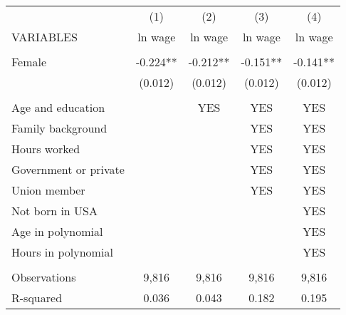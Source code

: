 \begin{tabular}{lcccc} 
\toprule
 & (1) & (2) & (3) & (4) \\
VARIABLES & ln wage & ln wage & ln wage & ln wage \\ \midrule
 &  &  &  &  \\
Female & -0.224** & -0.212** & -0.151** & -0.141** \\
 & (0.012) & (0.012) & (0.012) & (0.012) \\
 &  &  &  &  \\
Age and education &  & YES & YES & YES \\
Family background &  &  & YES & YES \\
Hours worked &  &  & YES & YES \\
Government or private &  &  & YES & YES \\
Union member &  &  & YES & YES \\
Not born in USA &  &  &  & YES \\
Age in polynomial &  &  &  & YES \\
Hours in polynomial &  &  &  & YES \\
 &  &  &  &  \\
 \midrule
Observations & 9,816 & 9,816 & 9,816 & 9,816 \\
 R-squared & 0.036 & 0.043 & 0.182 & 0.195 \\ 
 \bottomrule
\end{tabular}
